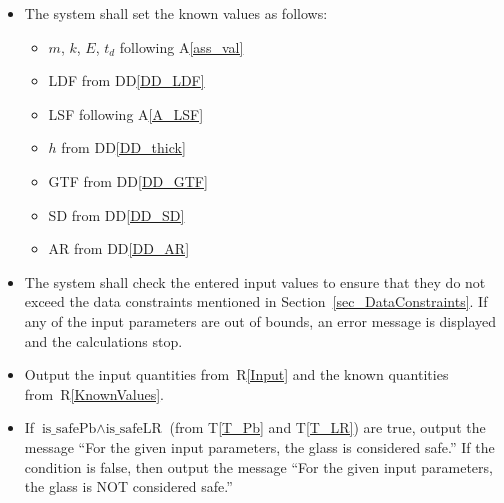 \documentclass[12pt]{article}
\newcommand{\ddref}[1]{DD\ref{#1}}
\newcommand{\tref}[1]{T\ref{#1}}
\newcommand{\aref}[1]{A\ref{#1}}
\newcounter{reqnum} %
\newcommand{\rref}[1]{R\ref{#1}}
\begin{document}
\begin{itemize}
\item [R\refstepcounter{reqnum}\thereqnum \label{KnownValues}:]

The system shall set the known values as follows:
\begin{itemize}
\item $m$, $k$, $E$, $t_d$ following \aref{ass_val}
\item LDF from \ddref{DD_LDF}
\item LSF following \aref{A_LSF}
\item $h$ from \ddref{DD_thick}
\item GTF from \ddref{DD_GTF}
\item SD from \ddref{DD_SD}
\item AR from \ddref{DD_AR}
\end{itemize}

\item[R\refstepcounter{reqnum}\thereqnum \label{Verify}:]

  The system shall check the entered input values to ensure that they do not
  exceed the data constraints mentioned in Section~\ref{sec_DataConstraints}.  If any of
  the input parameters are out of bounds, an error message is displayed and the
  calculations stop.

\item[R\refstepcounter{reqnum}\thereqnum \label{R_OutputInput}:]

  Output the input quantities from~\rref{Input} and the known quantities
  from~\rref{KnownValues}.


\item[R\refstepcounter{reqnum}\thereqnum \label{R_ Comparison}:] If
  $\text{is\_safePb} \wedge \text{is\_safeLR}$ (from \tref{T_Pb} and \tref{T_LR}) are true,
  output the message ``For the given input parameters, the glass is considered
  safe.''  If the condition is false, then output the message ``For the given
  input parameters, the glass is NOT considered safe.''


\end{itemize}
\end{document}
